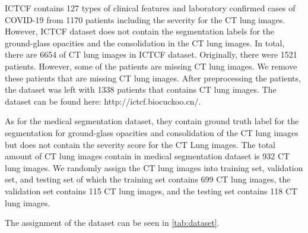 ICTCF contains 127 types of clinical features and laboratory confirmed cases of COVID-19 from 1170 patients including the severity for the CT lung images. However, ICTCF dataset does not contain the segmentation labels for the ground-glass opacities and the consolidation in the CT lung images. In total, there are 6654 of CT lung images in ICTCF dataset. Originally, there were 1521 patients. However, some of the patients are missing CT lung images. We remove these patients that are missing CT lung images. After preprocessing the patients, the dataset was left with 1338 patients that contains CT lung images. The dataset can be found here: http://ictcf.biocuckoo.cn/. 

As for the medical segmentation dataset, they contain ground truth label for the segmentation for ground-glass opacities and consolidation of the CT lung images but does not contain the severity score for the CT Lung images. The total amount of CT lung images contain in medical segmentation dataset is 932 CT lung images. We randomly assign the CT lung images into training set, validation set, and testing set of which the training set contains 699 CT lung images, the validation set contains 115 CT lung images, and the testing set contains 118 CT lung images. 

The assignment of the dataset can be seen in \ref{tab:dataset}.


